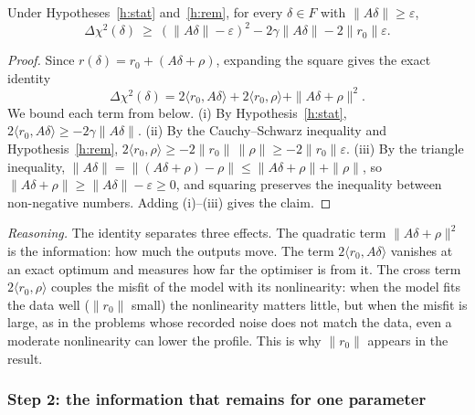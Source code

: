 \begin{slemma}\label{l:lower}
Under Hypotheses~\ref{h:stat} and~\ref{h:rem}, for every $\delta\in F$ with $\|A\delta\|\ge\varepsilon$,
\[ \Delta\chi^2(\delta)\ \ge\ (\|A\delta\|-\varepsilon)^2-2\gamma\|A\delta\|-2\|r_0\|\varepsilon . \]
\end{slemma}
\begin{proof}
Since $r(\delta)=r_0+(A\delta+\rho)$, expanding the square gives the exact identity
\[ \Delta\chi^2(\delta)=2\langle r_0,A\delta\rangle+2\langle r_0,\rho\rangle+\|A\delta+\rho\|^2 . \]
We bound each term from below. (i) By Hypothesis~\ref{h:stat}, $2\langle r_0,A\delta\rangle\ge-2\gamma\|A\delta\|$. (ii) By the Cauchy--Schwarz inequality and Hypothesis~\ref{h:rem}, $2\langle r_0,\rho\rangle\ge-2\|r_0\|\,\|\rho\|\ge-2\|r_0\|\varepsilon$. (iii) By the triangle inequality, $\|A\delta\|=\|(A\delta+\rho)-\rho\|\le\|A\delta+\rho\|+\|\rho\|$, so $\|A\delta+\rho\|\ge\|A\delta\|-\varepsilon\ge0$, and squaring preserves the inequality between non-negative numbers. Adding (i)--(iii) gives the claim.
\end{proof}
\emph{Reasoning.} The identity separates three effects. The quadratic term $\|A\delta+\rho\|^2$ is the information: how much the outputs move. The term $2\langle r_0,A\delta\rangle$ vanishes at an exact optimum and measures how far the optimiser is from it. The cross term $2\langle r_0,\rho\rangle$ couples the misfit of the model with its nonlinearity: when the model fits the data well ($\|r_0\|$ small) the nonlinearity matters little, but when the misfit is large, as in the problems whose recorded noise does not match the data, even a moderate nonlinearity can lower the profile. This is why $\|r_0\|$ appears in the result.

\subsubsection*{Step 2: the information that remains for one parameter}

